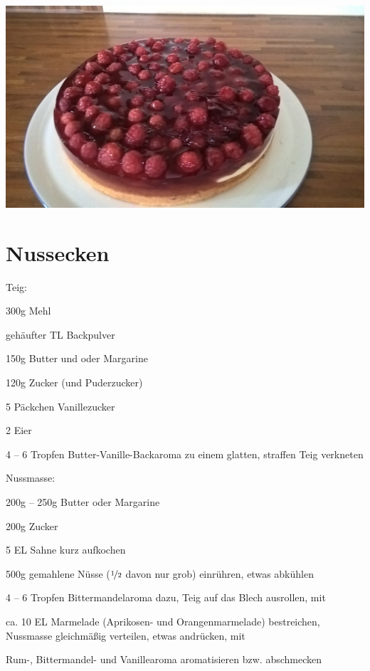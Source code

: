 \documentclass[a4,12pt,footinclude=true,oneside,headinclude=true]{scrartcl} %
\author[myemail@cookby.com]{Jokobus}
\begin{document}
	\begin{titlepage}
		\maketitle
		\includegraphics[width=\textwidth]{cake.jpg}
		\thispagestyle{empty}
	\end{titlepage}
	
	{\setcounter{page}{2}
		\normalfont
		\hypertarget{gototableofcontent}{}
		\tableofcontents
		\pagebreak
	}
	
\section{Nussecken}



Teig: 
\begin{ingredients}
	\item 300g Mehl
	\item \twothree gehäufter TL Backpulver 
	\item 150g Butter und oder Margarine
	\item 120g Zucker (und Puderzucker)
	\item 5 Päckchen Vanillezucker
	\item 2 Eier 
	\item 4 -- 6 Tropfen Butter-Vanille-Backaroma
	\subitem zu einem glatten, straffen Teig verkneten
\end{ingredients}
	Nussmasse: 

\begin{ingredients}
	\item 200g -- 250g Butter oder Margarine
	\item 200g Zucker
	\item 5 EL Sahne 
		\subitem kurz aufkochen
	\item 500g gemahlene Nüsse ($\nicefrac{1}{2}$ davon nur grob)
		\subitem einrühren, etwas abkühlen
	\item 4 -- 6 Tropfen Bittermandelaroma
		\subitem dazu, Teig auf das Blech ausrollen, mit
	\item ca. 10 EL Marmelade (Aprikosen- und Orangenmarmelade)
		\subitem bestreichen, Nussmasse gleichmäßig verteilen, etwas andrücken, mit
	\item Rum-, Bittermandel- und Vanillearoma
		\subitem aromatisieren bzw. abschmecken
\end{ingredients} 
\end{document}
